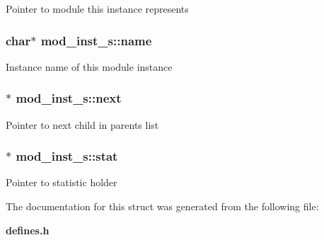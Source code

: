 Pointer to module this instance represents 
\subsubsection{\setlength{\rightskip}{0pt plus 5cm}char$\ast$ mod\_\-inst\_\-s::name}\label{structmod__inst__s_m0}


Instance name of this module instance 
\subsubsection{$\ast$ mod\_\-inst\_\-s::next}\label{structmod__inst__s_m5}


Pointer to next child in parents list 
\subsubsection{$\ast$ mod\_\-inst\_\-s::stat}\label{structmod__inst__s_m2}


Pointer to statistic holder 

The documentation for this struct was generated from the following file:\begin{CompactItemize}
\item 
{\bf defines.h}\end{CompactItemize}
